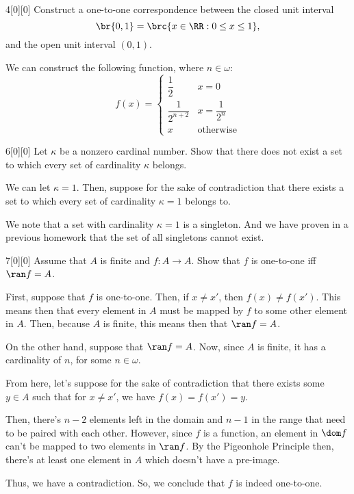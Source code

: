 \documentclass{article}
\begin{document}
\begin{hw}{4}[0][0]
	Construct a one-to-one correspondence between the closed unit interval
	\begin{equation*}
		\br{0,1} = \brc{x \in \RR : 0 \leq x \leq 1},
	\end{equation*}
	and the open unit interval $(0,1)$.
\end{hw}
\begin{solution}
	We can construct the following function, where $n \in \omega$:
	\begin{equation*}
		f(x) = \begin{cases}
			\dfrac{1}{2} & x = 0 \\
			\dfrac{1}{2^{n+2}} & x = \dfrac{1}{2^{n}} \\
			x & \text{otherwise}
		\end{cases}
	\end{equation*}
\end{solution}

\begin{hw}{6}[0][0]
	Let $\kappa$ be a nonzero cardinal number. Show that there does not exist a set to which every set of cardinality $\kappa$ belongs.
\end{hw}
\begin{solution}
	We can let $\kappa = 1$. Then, suppose for the sake of contradiction that there exists a set to which every set of cardinality $\kappa = 1$ belongs to. 
	
	We note that a set with cardinality $\kappa = 1$ is a singleton. And we have proven in a previous homework that the set of all singletons cannot exist.
\end{solution}

\begin{hw}{7}[0][0]
	Assume that $A$ is finite and $f : A \rightarrow A$. Show that $f$ is one-to-one iff $\ran f = A$.
\end{hw}
\begin{solution}
	First, suppose that $f$ is one-to-one. Then, if $x \neq x'$, then $f(x) \neq f(x')$. This means then that every element in $A$ must be mapped by $f$ to some other element in $A$. Then, because $A$ is finite, this means then that $\ran f = A$.
	
	On the other hand, suppose that $\ran f = A$. Now, since $A$ is finite, it has a cardinality of $n$, for some $n \in \omega$.
	
	From here, let's suppose for the sake of contradiction that there exists some $y \in A$ such that for $x \neq x'$, we have $f(x) = f(x') = y$.
	
	Then, there's $n-2$ elements left in the domain and $n-1$ in the range that need to be paired with each other. However, since $f$ is a function, an element in $\dom f$ can't be mapped to two elements in $\ran f$. By the Pigeonhole Principle then, there's at least one element in $A$ which doesn't have a pre-image.
	
	Thus, we have a contradiction. So, we conclude that $f$ is indeed one-to-one.
\end{solution}
\end{document}
